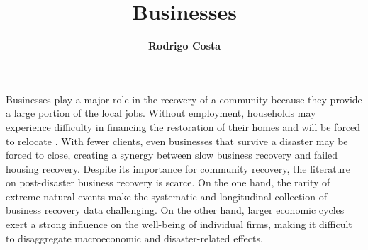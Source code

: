 %
%
%


%
%
%
%
%
%
%
%

\title{Businesses}
\author{
    \textbf{Rodrigo Costa}}
\tocauthor{}
%
%
\maketitle
Businesses play a major role in the recovery of a community because they provide a large portion of the local jobs. Without employment, households may experience difficulty in financing the restoration of their homes and will be forced to relocate \citep{bolin1983recovery, wang2015influencing}. With fewer clients, even businesses that survive a disaster may be forced to close, creating a synergy between slow business recovery and failed housing recovery. Despite its importance for community recovery, the literature on post-disaster business recovery is scarce. On the one hand, the rarity of extreme natural events make the systematic and longitudinal collection of business recovery data challenging. On the other hand, larger economic cycles exert a strong influence on the well-being of individual firms, making it difficult to disaggregate macroeconomic and disaster-related effects.

